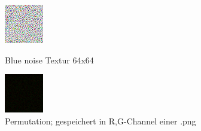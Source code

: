 \begin{figure}[H]\label{pic:Retargeting}
    \centering
    \begin{minipage}[t]{0.45\linewidth}
        \centering
        \includegraphics[width=\linewidth]{content/simulatedAnnealing/Bilder/LDR_RGBA_64.png}
        \caption{Blue noise Textur 64x64}
    \end{minipage}
    \hfill
    \begin{minipage}[t]{0.45\linewidth}
        \centering
        \includegraphics[width=\linewidth]{content/simulatedAnnealing/Bilder/LDR_RGBA_64_retarget_texture.png}
        \caption{Permutation; gespeichert in R,G-Channel einer .png}
    \end{minipage}
\end{figure}

